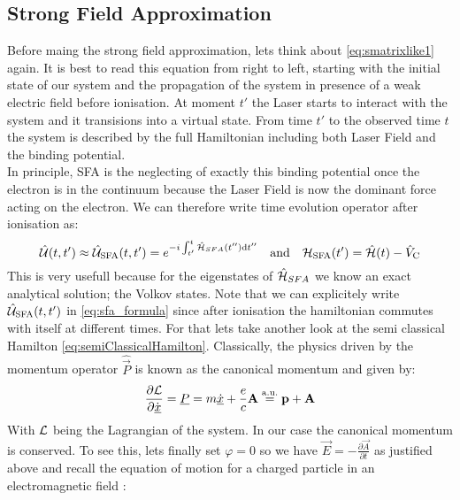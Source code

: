 \subsection{Strong Field Approximation}
Before maing the strong field approximation, lets think about \eqref{eq:smatrixlike1} again.
It is best to read this equation from right to left, starting with the initial state of our system and the propagation of the system in presence of a weak electric field before ionisation. 
At moment $t'$ the Laser starts to interact with the system and it transisions into a virtual state. 
From time $t'$ to the observed time $t$ the system is described by the full Hamiltonian including both Laser Field and the binding potential.\\
In principle, SFA is the neglecting of exactly this binding potential once the electron is in the continuum because the Laser Field is now the dominant force acting on the electron.
We can therefore write time evolution operator after ionisation as:
\begin{equation*}
    \hat{\mathcal{U}}(t,t') \approx \hat{\mathcal{U}}_{\mathrm{SFA}}(t,t')=e^{-i \int_{t'}^{t} \hat{\mathcal{H}}_{SFA}(t'') \mathrm{d} t''} \quad \text{and} \quad \mathcal{H}_{\mathrm{SFA}}(t') = \hat{\mathcal{H}}(t) - \hat{V}_{\mathrm{C}}      \label{eq:sfa_formula}
\end{equation*}
This is very usefull because for the eigenstates of $\hat{\mathcal{H}}_{SFA}$ we know an exact analytical solution; the Volkov states.
Note that we can explicitely write $\hat{\mathcal{U}}_{\mathrm{SFA}}(t,t')$ in \eqref{eq:sfa_formula} since after ionisation the hamiltonian commutes with itself at different times.
For that lets take another look at the semi classical Hamilton \eqref{eq:semiClassicalHamilton}. 
Classically, the physics driven by the momentum operator $\hat{\vec{P}}$ is known as the canonical momentum and given by:
\begin{equation}
    \frac{\partial \mathcal{L}}{\partial \dot{\underline{x}}} = \underline{P} = m\underline{\dot{x}} + \frac{e}{c}\mathbf{A} \stackrel{\mathrm{a.u.}}{=} \mathbf{p} + \mathbf{A}    \label{eq:canonicalMomentum}
\end{equation}
With $\mathcal{L}$ being the Lagrangian of the system.
In our case the canonical momentum is conserved. To see this, lets finally set $\varphi=0$ so we have $\vec{E} = -\frac{\partial \vec{A}}{\partial t}$ as justified above and recall the equation of motion for a charged particle in an electromagnetic field \cite{LandauLifschitzBand2}:
